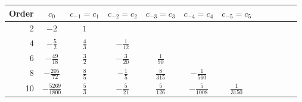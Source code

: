 \begin{tabular}{r|ccccccccccc}
Order & $c_0$ & $c_{-1}=c_{1}$ & $c_{-2}=c_{2}$ & $c_{-3}=c_{3}$ & $c_{-4}=c_{4}$ & $c_{-5}=c_{5}$\\[2pt]\hline
2 & $-2$ & $1$ & & & &\\[4pt]
4 & $- \frac{5}{2}$ & $\frac{4}{3}$ & $- \frac{1}{12}$ & & &\\[4pt]
6 & $- \frac{49}{18}$ & $\frac{3}{2}$ & $- \frac{3}{20}$ & $\frac{1}{90}$ & &\\[4pt]
8 & $- \frac{205}{72}$ & $\frac{8}{5}$ & $- \frac{1}{5}$ & $\frac{8}{315}$ & $- \frac{1}{560}$ &\\[4pt]
10 & $- \frac{5269}{1800}$ & $\frac{5}{3}$ & $- \frac{5}{21}$ & $\frac{5}{126}$ & $- \frac{5}{1008}$ & $\frac{1}{3150}$
\end{tabular}
